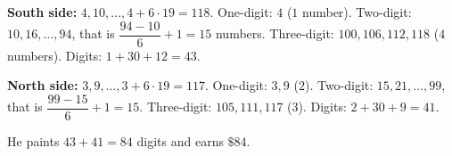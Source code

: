 \textbf{South side:} $4,10,\dots,4+6\cdot19=118$. One-digit: $4$ ($1$ number). Two-digit: $10,16,\dots,94$, that is $\dfrac{94-10}{6}+1=15$ numbers. Three-digit: $100,106,112,118$ ($4$ numbers). Digits: $1+30+12=43$.

\textbf{North side:} $3,9,\dots,3+6\cdot19=117$. One-digit: $3,9$ ($2$). Two-digit: $15,21,\dots,99$, that is $\dfrac{99-15}{6}+1=15$. Three-digit: $105,111,117$ ($3$). Digits: $2+30+9=41$.

He paints $43+41=84$ digits and earns $\boxed{\$84}$.
